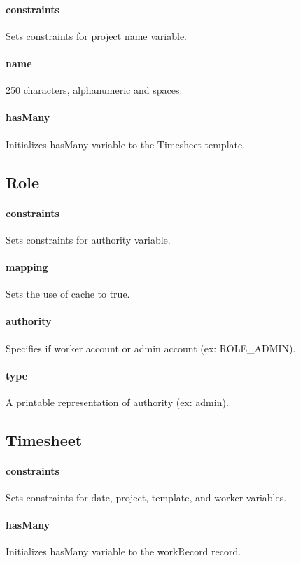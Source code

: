 \documentclass[12pt]{article}
\begin{document}
\paragraph{constraints} Sets constraints for project name variable.
\paragraph{name} 250 characters, alphanumeric and spaces.
\paragraph{hasMany} Initializes hasMany variable to the Timesheet template.

\setcounter{paragraph}{0}
\subsection{Role}\label{sec:DRole}
\paragraph{constraints} Sets constraints for authority variable.
\paragraph{mapping} Sets the use of cache to true.
\paragraph{authority} Specifies if worker account or admin account (ex: ROLE_ADMIN).
\paragraph{type} A printable representation of authority (ex: admin).

\setcounter{paragraph}{0}
\subsection{Timesheet}\label{sec:DTimesheet}
\paragraph{constraints} Sets constraints for date, project, template, and worker variables.
\paragraph{hasMany} Initializes hasMany variable to the workRecord record.
\end{document}
